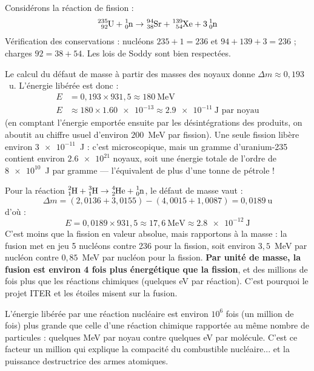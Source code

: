 \documentclass[11pt]{article}
\newcommand{\cle}[1]{{\popxbold\color{popdark}#1}}
\begin{document}
\begin{exemplebox}
Considérons la réaction de fission :
\[
\ce{^{235}_{92}U} + \ce{^{1}_{0}n} \rightarrow \ce{^{94}_{38}Sr} + \ce{^{139}_{54}Xe} + 3\,\ce{^{1}_{0}n}
\]
Vérification des conservations : nucléons $235 + 1 = 236$ et $94 + 139 + 3 = 236$ ; charges $92 = 38 + 54$. Les lois de Soddy sont bien respectées.
\par\smallskip
Le calcul du défaut de masse à partir des masses des noyaux donne $\Delta m \approx 0{,}193$~u. L'énergie libérée est donc :
\begin{align*}
E &= 0{,}193 \times 931{,}5 \approx 180~\text{MeV}\\
E &\approx 180 \times \num{1,60e-13} \approx \num{2,9e-11}~\text{J par noyau}
\end{align*}
(en comptant l'énergie emportée ensuite par les désintégrations des produits, on aboutit au chiffre usuel d'environ $200$~MeV par fission). Une seule fission libère environ $\num{3e-11}$~J : c'est microscopique, mais un gramme d'uranium-235 contient environ $\num{2,6e21}$ noyaux, soit une énergie totale de l'ordre de $\num{8e10}$~J par gramme — l'équivalent de plus d'une tonne de pétrole !
\end{exemplebox}

\begin{exemplebox}
Pour la réaction $\ce{^{2}_{1}H} + \ce{^{3}_{1}H} \rightarrow \ce{^{4}_{2}He} + \ce{^{1}_{0}n}$, le défaut de masse vaut :
\[
\Delta m = (2{,}0136 + 3{,}0155) - (4{,}0015 + 1{,}0087) = 0{,}0189~\text{u}
\]
d'où :
\[
E = 0{,}0189 \times 931{,}5 \approx 17{,}6~\text{MeV} \approx \num{2,8e-12}~\text{J}
\]
C'est moins que la fission en valeur absolue, mais rapportons à la masse : la fusion met en jeu 5 nucléons contre 236 pour la fission, soit environ $3{,}5$~MeV par nucléon contre $0{,}85$~MeV par nucléon pour la fission. \textbf{Par unité de masse, la fusion est environ 4 fois plus énergétique que la fission}, et des millions de fois plus que les réactions chimiques (quelques eV par réaction). C'est pourquoi le projet ITER et les étoiles misent sur la fusion.
\end{exemplebox}

\begin{aretenir}
L'énergie libérée par une réaction nucléaire est environ \cle{$10^6$ fois} (un million de fois) plus grande que celle d'une réaction chimique rapportée au même nombre de particules : quelques MeV par noyau contre quelques eV par molécule. C'est ce facteur un million qui explique la compacité du combustible nucléaire... et la puissance destructrice des armes atomiques.
\end{aretenir}
\end{document}
